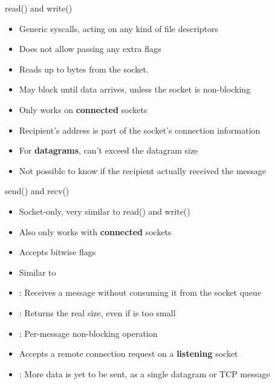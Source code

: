 \begin{frame}{read() and write()}
\begin{itemize}
	\item Generic syscalls, acting on any kind of file descriptors
	\item Does not allow passing any extra flags
\end{itemize}
	\begin{itemize}
		\item Reads up to  bytes from the socket.
		\item May block until data arrives, unless the socket is non-blocking
	\end{itemize}
	\vspace{0.5cm}
	\begin{itemize}
		\item Only works on \textbf{connected} sockets
		\item Recipient's address is part of the socket's connection information
		\item For \textbf{datagrams},  can't exceed the datagram size
		\item Not possible to know if the recipient actually received the message
	\end{itemize}
\end{frame}

\begin{frame}{send() and recv()}
\begin{itemize}
	\item Socket-only, very similar to read() and write()
	\item Also only works with \textbf{connected} sockets
	\item Accepts  bitwise flags
\end{itemize}
	\begin{itemize}
		\item Similar to 
		\item {} : Receives a message without consuming it from the socket queue
		\item {} : Returns the real size, even if  is too small
		\item {} : Per-message non-blocking operation
	\end{itemize}
	\vspace{0.5cm}
	\begin{itemize}
		\item Accepts a remote connection request on a \textbf{listening} socket
		\item {} : More data is yet to be sent, as a single datagram or TCP message
	\end{itemize}

\end{frame}

